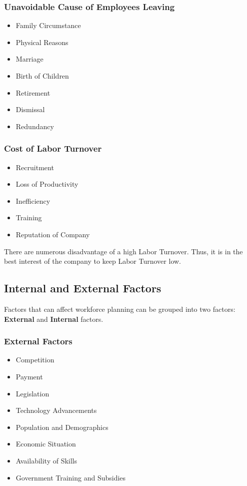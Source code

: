 \documentclass{standalone}
\begin{document}
\subsubsection{Unavoidable Cause of Employees Leaving}
\begin{itemize}
	\item Family Circumstance
	\item Physical Reasons
	\item Marriage
	\item Birth of Children
	\item Retirement
	\item Dismissal
	\item Redundancy
\end{itemize}

\subsubsection{Cost of Labor Turnover}
\begin{itemize}
	\item Recruitment
	\item Loss of Productivity
	\item Inefficiency
	\item Training
	\item Reputation of Company
\end{itemize}

There are numerous disadvantage of a high Labor Turnover.
Thus, it is in the best interest of the company to keep Labor Turnover low.

\subsection{Internal and External Factors}

Factors that can affect workforce planning can be grouped into two factors: \textbf{External} and \textbf{Internal} factors.

\subsubsection{External Factors}
\begin{itemize}
	\item Competition
	\item Payment
	\item Legislation
	\item Technology Advancements
	\item Population and Demographics
	\item Economic Situation
	\item Availability of Skills
	\item Government Training and Subsidies
\end{itemize}
\end{document}
